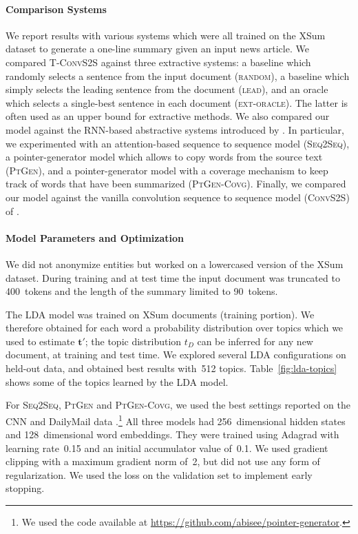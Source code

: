 \documentclass[11pt,a4paper]{article}
\begin{document}
\paragraph{Comparison Systems} 
We report results with various systems which were all trained on the
XSum dataset to generate a one-line summary given an input news
article.  We compared \mbox{\textsc{T-ConvS2S}} against three
extractive systems: a baseline which randomly selects a sentence from
the input document (\textsc{random}), a baseline which simply selects
the leading sentence from the document (\textsc{lead}), and an oracle
which selects a single-best sentence in each document
(\textsc{ext-oracle}). The latter is often used as an upper bound for
extractive methods. We also compared our model against the RNN-based
abstractive systems introduced by . In particular,
we experimented with an attention-based sequence to sequence model
(\textsc{Seq2Seq}), a pointer-generator model which allows to copy
words from the source text (\textsc{PtGen}), and a pointer-generator
model with a coverage mechanism to keep track of words that have been
summarized (\textsc{PtGen-Covg}). Finally, we compared our model
against the vanilla convolution sequence to sequence model
(\textsc{ConvS2S}) of .



\paragraph{Model Parameters and Optimization} 

We did not anonymize entities but worked on a lowercased version of
the XSum dataset. During training and at test time the input document
was truncated to 400~tokens and  the length of the summary limited to
90~tokens.

The LDA model \cite{Blei:2003:LDA} was trained on XSum documents
(training portion). We therefore obtained for each word a probability
distribution over topics which we used to estimate $\mathbf{t'}$; the
topic distribution $t_D$ can be inferred for any new document, at
training and test time. We explored several LDA configurations on
held-out data, and obtained best results with~512
topics. Table~\ref{fig:lda-topics} shows some of the topics learned by
the LDA model.



For \textsc{Seq2Seq}, \textsc{PtGen} and \textsc{PtGen-Covg}, we used
the best settings reported on the CNN and DailyMail data
\cite{see-acl17}.\footnote{We used the code available at
  \url{https://github.com/abisee/pointer-generator}.}  All three
models had 256~dimensional hidden states and 128~dimensional word
embeddings. They were trained using Adagrad \cite{Duchi:2011} with
learning rate~0.15 and an initial accumulator value of~0.1. We used
gradient clipping with a maximum gradient norm of~2, but did not use
any form of regularization.  We used the loss on the validation set to
implement early stopping. 
\end{document}
